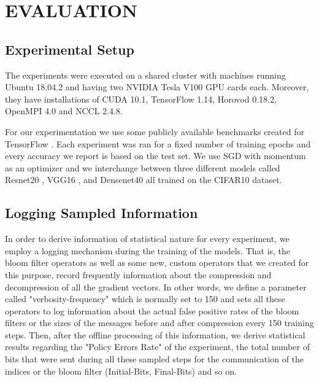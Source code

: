 \chapter{EVALUATION}

    \section{Experimental Setup}
    The experiments were executed on a shared cluster with machines running Ubuntu 18.04.2 and having two NVIDIA Tesla V100 GPU cards each. 
    Moreover, they have installations of CUDA 10.1, TensorFlow 1.14, Horovod 0.18.2, OpenMPI 4.0 and NCCL 2.4.8.
    
    For our experimentation we use some publicly available benchmarks created for TensorFlow \cite{tf-benchmark}.
    Each experiment was ran for a fixed number of training epochs and every accuracy we report is based on the test set.
    We use SGD with momentum as an optimizer and we interchange between three different models called Resnet20 \cite{he2015deep}, VGG16 \cite{simonyan2014deep}, and Densenet40 \cite{huang2016densely} all trained on the CIFAR10 \cite{cifar} dataset.
    
    \section{Logging Sampled Information}

    In order to derive information of statistical nature for every experiment, we employ a logging mechanism during the training of the models.
    That is, the bloom filter operators as well as some new, custom operators that we created for this purpose, record frequently information about the compression and decompression of all the gradient vectors.
    In other words, we define a parameter called "verbosity-frequency" which is normally set to 150 and sets all these operators to log information about the actual false positive rates of the bloom filters or the sizes of the messages before and after compression every 150 training steps.
    Then, after the offline processing of this information, we derive statistical results regarding the "Policy Errors Rate" of the experiment, the total number of bits that were sent during all these sampled steps for the communication of the indices or the bloom filter (Initial-Bits, Final-Bits) and so on.
    
